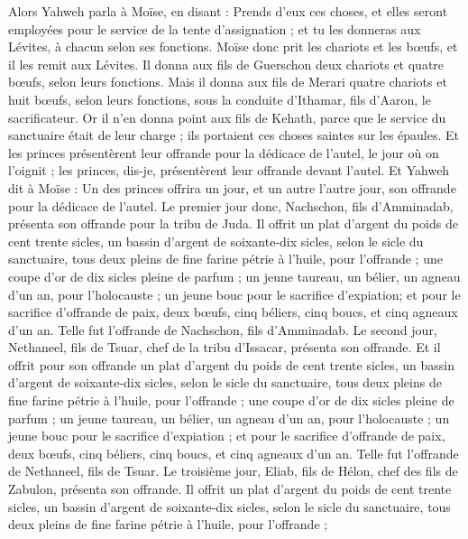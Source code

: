 \begin{multicols}{2}
Alors Yahweh parla à Moïse, en disant :
Prends d'eux ces choses, et elles seront employées pour le service de la tente d'assignation ; et tu les donneras aux Lévites, à chacun selon ses fonctions.
Moïse donc prit les chariots et les bœufs, et il les remit aux Lévites.
Il donna aux fils de Guerschon deux chariots et quatre bœufs, selon leurs fonctions.
Mais il donna aux fils de Merari quatre chariots et huit bœufs, selon leurs fonctions, sous la conduite d'Ithamar, fils d'Aaron, le sacrificateur.
Or il n'en donna point aux fils de Kehath, parce que le service du sanctuaire était de leur charge ; ils portaient ces choses saintes sur les épaules.
Et les princes présentèrent leur offrande pour la dédicace de l'autel, le jour où on l'oignit ; les princes, dis-je, présentèrent leur offrande devant l'autel.
Et Yahweh dit à Moïse : Un des princes offrira un jour, et un autre l'autre jour, son offrande pour la dédicace de l'autel.
Le premier jour donc, Nachschon, fils d'Amminadab, présenta son offrande pour la tribu de Juda.
Il offrit un plat d'argent du poids de cent trente sicles, un bassin d'argent de soixante-dix sicles, selon le sicle du sanctuaire, tous deux pleins de fine farine pétrie à l'huile, pour l'offrande ;
une coupe d'or de dix sicles pleine de parfum ;
un jeune taureau, un bélier, un agneau d'un an, pour l'holocauste ;
un jeune bouc pour le sacrifice d'expiation;
et pour le sacrifice d'offrande de paix, deux bœufs, cinq béliers, cinq boucs, et cinq agneaux d'un an. Telle fut l'offrande de Nachschon, fils d'Amminadab.
Le second jour, Nethaneel, fils de Tsuar, chef de la tribu d'Issacar, présenta son offrande.
Et il offrit pour son offrande un plat d'argent du poids de cent trente sicles, un bassin d'argent de soixante-dix sicles, selon le sicle du sanctuaire, tous deux pleins de fine farine pétrie à l'huile, pour l'offrande ;
une coupe d'or de dix sicles pleine de parfum ;
un jeune taureau, un bélier, un agneau d'un an, pour l'holocauste ;
un jeune bouc pour le sacrifice d'expiation ;
et pour le sacrifice d'offrande de paix, deux bœufs, cinq béliers, cinq boucs, et cinq agneaux d'un an. Telle fut l'offrande de Nethaneel, fils de Tsuar.
Le troisième jour, Eliab, fils de Hélon, chef des fils de Zabulon, présenta son offrande.
Il offrit un plat d'argent du poids de cent trente sicles, un bassin d'argent de soixante-dix sicles, selon le sicle du sanctuaire, tous deux pleins de fine farine pétrie à l'huile, pour l'offrande ;

\end{multicols}
